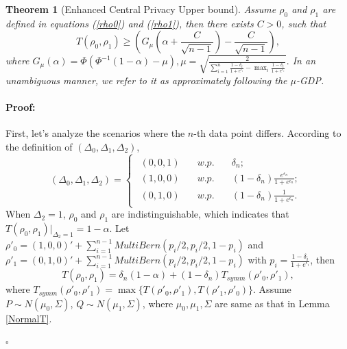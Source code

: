 \documentclass[letterpaper]{article} %
\newtheorem{theorem}{Theorem}
\newenvironment{proof}{\paragraph{Proof:}}{\hfill$\square$}
\begin{document}
\begin{theorem}[Enhanced Central Privacy Upper bound] \label{thm:GDPdistance}
Assume $\rho_0$ and $\rho_1$ are defined in equations (\ref{rho0}) and (\ref{rho1}), then there exists $C>0$, such that
\begin{equation}
T(\rho_0,\rho_1) \ge \left(G_\mu\left({\alpha+\frac{C}{\sqrt{n-1}}}\right)-\frac{C}{\sqrt{n-1}}\right)
,
\end{equation}
where
$G_\mu(\alpha) = \Phi(\Phi^{-1}(1-\alpha)-\mu), 
\mu = \sqrt{\frac{2}{\sum_{i=1}^{n} \frac{1-\delta_i}{1+e^{\epsilon_i}}-\max_{i}{\frac{1-\delta_{i}}{1+e^{\epsilon_{i}}}}}}.
$
In an unambiguous manner, we refer to it as approximately following the $\mu$-GDP.
\end{theorem}
\begin{proof}
First, let's analyze the scenarios where the $n$-th data point differs.
According to the definition of $(\Delta_0,\Delta_1,\Delta_2)$,
\begin{equation}
(\Delta_0,\Delta_1,\Delta_2) =
\begin{cases}
    \begin{array}{lll}
        (0,0,1) & \quad w.p. & \quad \delta_{n}; \\
        (1,0,0) &  \quad w.p. & \quad (1-\delta_{n})\frac{e^{\epsilon_{n}}}{1+e^{\epsilon_{n}}}; \\
        (0,1,0) & \quad  w.p. & \quad (1-\delta_{n})\frac{1}{{1+e^{\epsilon_{n}}}}.
    \end{array}
\end{cases}
\end{equation}
When $\Delta_2 = 1$, $\rho_0$ and $\rho_1$ are  indistinguishable, which indicates that $T(\rho_0,\rho_1)|_{\Delta_2=1} = 1-\alpha$.
 Let $\rho'_0=(1,0,0)'+\sum_{i=1}^{n-1}MultiBern\left(p_i/2,p_i/2,1-p_i\right)$ and $\rho'_1=(0,1,0)'+\sum_{i=1}^{n-1}MultiBern\left(p_i/2,p_i/2,1-p_i\right)$ with $p_i =
 \frac{1-\delta_i}{1+e^{\epsilon_i}}
 $, then
\begin{equation}
T(\rho_0,\rho_1) = \delta_{n}(1-\alpha)+(1-\delta_{n})T_{symm}(\rho'_0,\rho'_1),
\end{equation}
where $T_{symm}(\rho'_0,\rho'_1) = \max \{T(\rho'_0,\rho'_1),T(\rho'_1,\rho'_0)\}$.
Assume $P \sim N(\mu_0,\Sigma)$, $Q \sim N(\mu_1,\Sigma)$, where $\mu_0,\mu_1,\Sigma$ are same as that in Lemma \ref{NormalT}.

\end{proof}
\end{document}

